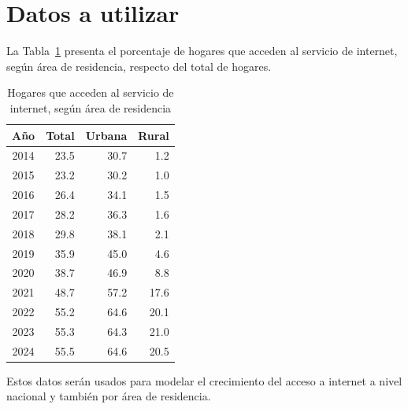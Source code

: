 \section{Datos a utilizar}

La Tabla~\ref{tab:hogares-internet} presenta el porcentaje de hogares que acceden al servicio de internet, según área de residencia, respecto del total de hogares.

\begin{table}[H]
    \centering
    \caption{Hogares que acceden al servicio de internet, según área de residencia}
    \label{tab:hogares-internet}
    \begin{tabular}{crrr}
        \toprule
        \textbf{Año} & \textbf{Total} & \textbf{Urbana} & \textbf{Rural} \\
        \midrule
        2014 & 23.5 & 30.7 & 1.2 \\
        2015 & 23.2 & 30.2 & 1.0 \\
        2016 & 26.4 & 34.1 & 1.5 \\
        2017 & 28.2 & 36.3 & 1.6 \\
        2018 & 29.8 & 38.1 & 2.1 \\
        2019 & 35.9 & 45.0 & 4.6 \\
        2020 & 38.7 & 46.9 & 8.8 \\
        2021 & 48.7 & 57.2 & 17.6 \\
        2022 & 55.2 & 64.6 & 20.1 \\
        2023 & 55.3 & 64.3 & 21.0 \\
        2024 & 55.5 & 64.6 & 20.5 \\
        \bottomrule
    \end{tabular}
\end{table}

Estos datos serán usados para modelar el crecimiento del acceso a internet a nivel nacional y también por área de residencia.
